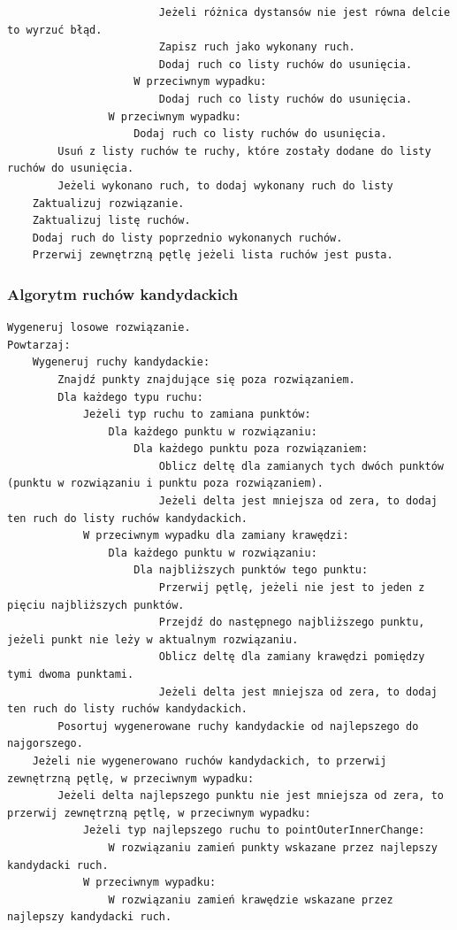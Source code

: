 \documentclass[a4paper]{article}
\begin{document}
\begin{lstlisting}
                        Jeżeli różnica dystansów nie jest równa delcie to wyrzuć błąd.
                        Zapisz ruch jako wykonany ruch.
                        Dodaj ruch co listy ruchów do usunięcia.
                    W przeciwnym wypadku:
                        Dodaj ruch co listy ruchów do usunięcia.
                W przeciwnym wypadku:
                    Dodaj ruch co listy ruchów do usunięcia.
        Usuń z listy ruchów te ruchy, które zostały dodane do listy ruchów do usunięcia.
        Jeżeli wykonano ruch, to dodaj wykonany ruch do listy
    Zaktualizuj rozwiązanie.
    Zaktualizuj listę ruchów.
    Dodaj ruch do listy poprzednio wykonanych ruchów.
    Przerwij zewnętrzną pętlę jeżeli lista ruchów jest pusta.
\end{lstlisting}

\subsubsection{Algorytm ruchów kandydackich}

\begin{lstlisting}
Wygeneruj losowe rozwiązanie.
Powtarzaj:
    Wygeneruj ruchy kandydackie:
        Znajdź punkty znajdujące się poza rozwiązaniem.
        Dla każdego typu ruchu:
            Jeżeli typ ruchu to zamiana punktów:
                Dla każdego punktu w rozwiązaniu:
                    Dla każdego punktu poza rozwiązaniem:
                        Oblicz deltę dla zamianych tych dwóch punktów (punktu w rozwiązaniu i punktu poza rozwiązaniem).
                        Jeżeli delta jest mniejsza od zera, to dodaj ten ruch do listy ruchów kandydackich.
            W przeciwnym wypadku dla zamiany krawędzi:
                Dla każdego punktu w rozwiązaniu:
                    Dla najbliższych punktów tego punktu:
                        Przerwij pętlę, jeżeli nie jest to jeden z pięciu najbliższych punktów.
                        Przejdź do następnego najbliższego punktu, jeżeli punkt nie leży w aktualnym rozwiązaniu.
                        Oblicz deltę dla zamiany krawędzi pomiędzy tymi dwoma punktami.
                        Jeżeli delta jest mniejsza od zera, to dodaj ten ruch do listy ruchów kandydackich.
        Posortuj wygenerowane ruchy kandydackie od najlepszego do najgorszego.
    Jeżeli nie wygenerowano ruchów kandydackich, to przerwij zewnętrzną pętlę, w przeciwnym wypadku:
        Jeżeli delta najlepszego punktu nie jest mniejsza od zera, to przerwij zewnętrzną pętlę, w przeciwnym wypadku:
            Jeżeli typ najlepszego ruchu to pointOuterInnerChange:
                W rozwiązaniu zamień punkty wskazane przez najlepszy kandydacki ruch.
            W przeciwnym wypadku:
                W rozwiązaniu zamień krawędzie wskazane przez najlepszy kandydacki ruch.

\end{lstlisting}
\end{document}
